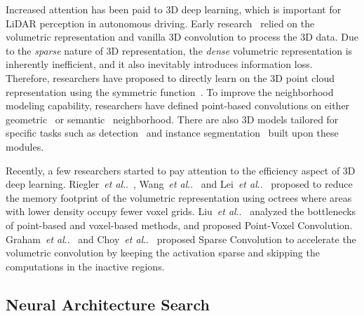 \documentclass[runningheads]{llncs}
\makeatletter
\DeclareRobustCommand\onedot{\futurelet\@let@token\@onedot}
\def\@onedot{\ifx\@let@token.\else.\null\fi\xspace}
\def\etal{\emph{et al}\onedot}
\makeatother
\begin{document}
Increased attention has been paid to 3D deep learning, which is important for LiDAR perception in autonomous driving. Early research~\cite{chang2015shapenet,maturana2015voxnet,qi2016volumetric,wang2019voxsegnet,zhou2018voxelnet} relied on the volumetric representation and vanilla 3D convolution to process the 3D data. Due to the \textit{sparse} nature of 3D representation, the \textit{dense} volumetric representation is inherently inefficient, and it also inevitably introduces information loss. Therefore, researchers have proposed to directly learn on the 3D point cloud representation using the symmetric function~\cite{qi2017pointnet}. To improve the neighborhood modeling capability, researchers have defined point-based convolutions on either geometric~\cite{li2018pointcnn,mao2019interpolated,qi2017pointnet++,su2018splatnet,tatarchenko2018tangent,thomas2019kpconv,wu2019pointconv,xu2018spidercnn} or semantic~\cite{wang2018dynamic} neighborhood. There are also 3D models tailored for specific tasks such as detection~\cite{qi2020imvotenet,qi2019deep,qi2018frustum,shi2019pvrcnn,shi2019pointrcnn,shi2019parta2,yan2018second,yang2019std} and instance segmentation~\cite{han2020occuseg,jiang2020pointgroup,lahoud2019multi,yang2019learning} built upon these modules.

Recently, a few researchers started to pay attention to the efficiency aspect of 3D deep learning. Riegler~\etal~\cite{riegler2017octnet}, Wang~\etal~\cite{wang2017cnn,wang2018adaptive} and Lei~\etal~\cite{lei2019octree} proposed to reduce the memory footprint of the volumetric representation using octrees where areas with lower density occupy fewer voxel grids. Liu~\etal~\cite{liu2019point} analyzed the bottlenecks of point-based and voxel-based methods, and proposed Point-Voxel Convolution. Graham~\etal~\cite{graham20183d} and Choy~\etal~\cite{choy20194d} proposed Sparse Convolution to accelerate the volumetric convolution by keeping the activation sparse and skipping the computations in the inactive regions.

\subsection{Neural Architecture Search}
\end{document}
